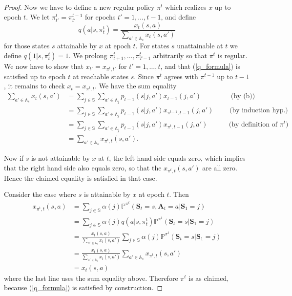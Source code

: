\documentclass{article}
\theoremstyle{definition}
\numberwithin{equation}{section}
\begin{document}
{\begin{proof}

Now we have to define a
new regular policy $\pi^t$ which realizes $x$ up to epoch $t$. We let $\pi^t_{t'} = \pi^{t-1}_{t'}$ 
for epochs $t'=1,\dots, t-1$, and define
$$
q(a|s,\pi^t_t) = \frac{x_t(s,a)}{\sum_{a'\in \mathbb{A}_s} x_t(s,a')}
$$
for those states $s$ attainable by $x$ at epoch $t$. For
states $s$ unattainable at $t$ we define
$q(1|s,\pi_t^t)=1$. We prolong $\pi_{t+1}^t,\dots,\pi_{T-1}^t$ arbitrarily so that $\pi^t$
is regular. We now have to show that $x_{t'} = x_{\pi^t,t'}$ for $t'=1,\dots, t$, and that (\ref{q_formula}) is satisfied up to epoch $t$
at reachable states $s$. Since $\pi^t$ agrees with $\pi^{t-1}$ up to $t-1$, it remains to
check $x_t = x_{\pi^t,t}$. 
%
We have the sum equality
\begin{align*}
    \sum_{a'\in \mathbb{A}_s} x_t(s,a') &= \sum_{j\in \mathbb{S}} \sum_{a'\in \mathbb{A}_j} p_{t-1} (s|j,a') x_{t-1}(j,a') 
    \qquad\qquad \mbox{ (by (b))}\\
    &= \sum_{j\in \mathbb{S}} \sum_{a'\in \mathbb{A}_j} p_{t-1} (s|j,a') x_{\pi^{t-1},t-1}(j,a')  \qquad \mbox{ (by induction hyp.)}\\
    &=\sum_{j\in \mathbb{S}} \sum_{a'\in \mathbb{A}_j} p_{t-1} (s|j,a') x_{\pi^t,t-1}(j,a') \qquad \;\,\,\,\mbox{ (by definition of $\pi^t$})\\
    &= \sum_{a'\in \mathbb{A}_s} x_{\pi^t,t}(s,a').
    \end{align*}

    Now if $s$ is not attainable by $x$ at $t$, the left hand side equals zero, which implies that the
    right hand side also equals zero, so that the
    $x_{\pi^t,t}(s,a')$ are all zero. Hence the claimed equality is satisfied in that case.
    

    Consider the case where $s$ is attainable by $x$ at epoch $t$. Then 
    \begin{align*}
    x_{\pi^t,t}(s,a) &= \sum_{j \in \mathbb{S}} \alpha(j) \mathbb P^{\pi^t}(\textbf{S}_t=s,\textbf{A}_t=a|\textbf{S}_1=j)\\
    &= \sum_{j\in \mathbb{S}} \alpha(j) q(a|s,\pi^t_t) \mathbb P^{\pi^t}(\textbf{S}_t=s|\textbf{S}_1=j)\\
    &= \frac{x_t(s,a)}{\sum_{a'\in \mathbb{A}_s} x_t(s,a')} \sum_{j\in \mathbb{S}} \alpha(j) \mathbb P^{\pi^t}(\textbf{S}_t=s|\textbf{S}_1=j)\\
    &=  \frac{x_t(s,a)}{\sum_{a'\in \mathbb{A}_s} x_t(s,a')} \sum_{a'\in \mathbb{A}_s} x_{\pi^t,t}(s,a')\\
    &= x_t(s,a)
    \end{align*}
    where the last line uses the sum equality above. Therefore $\pi^t$ is as claimed, because
    (\ref{q_formula}) is satisfied by construction. 


\end{proof}}
\end{document}
